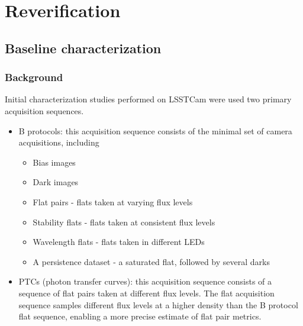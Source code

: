 \section{Reverification}\label{reverification}

\subsection{Baseline characterization}\label{baseline-characterization}

\subsubsection{Background}\label{background}

Initial characterization studies performed on LSSTCam were used two
primary acquisition sequences.

\begin{itemize}
\tightlist
\item
  B protocols: this acquisition sequence consists of the minimal set of
  camera acquisitions, including

  \begin{itemize}
  \tightlist
  \item
    Bias images
  \item
    Dark images
  \item
    Flat pairs - flats taken at varying flux levels
  \item
    Stability flats - flats taken at consistent flux levels
  \item
    Wavelength flats - flats taken in different LEDs
  \item
    A persistence dataset - a saturated flat, followed by several darks
  \end{itemize}
\item
  PTCs (photon transfer curves): this acquisition sequence consists of a
  sequence of flat pairs taken at different flux levels. The flat
  acquisition sequence samples different flux levels at a higher density
  than the B protocol flat sequence, enabling a more precise estimate of
  flat pair metrics.
\end{itemize}


